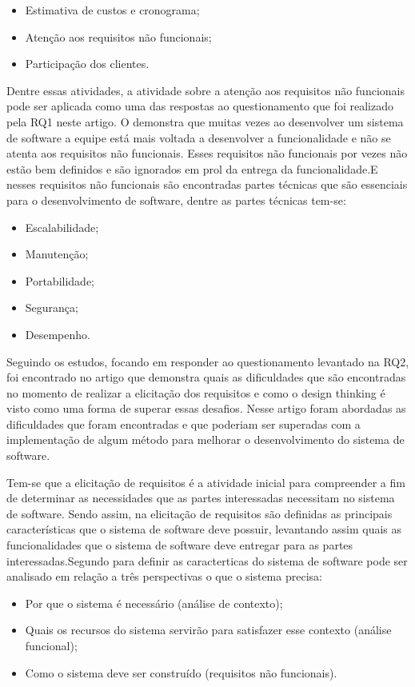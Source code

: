 \documentclass[a4paper,twoside]{article}
\begin{document}
\begin{itemize}
    \item Estimativa de custos e cronograma;
    \item Atenção aos requisitos não funcionais;
    \item Participação dos clientes.
\end{itemize}
Dentre essas atividades, a atividade sobre a atenção aos requisitos não funcionais pode ser aplicada como uma das respostas ao questionamento que foi realizado pela RQ1 neste artigo.
O \cite{DBLP:journals/information/MartinsJCKPO19} demonstra que muitas vezes ao desenvolver um sistema de software a equipe está mais voltada a desenvolver a funcionalidade e não se atenta aos requisitos não funcionais. Esses requisitos não funcionais por vezes não estão bem definidos e são ignorados em prol da entrega da funcionalidade.E nesses requisitos não funcionais são encontradas partes técnicas que são essenciais para o desenvolvimento de software, dentre as partes técnicas tem-se:

\begin{itemize}
    \item Escalabilidade;
    \item Manutenção;
    \item Portabilidade;
    \item Segurança;
    \item Desempenho.
\end{itemize}

Seguindo os estudos, focando em responder ao questionamento levantado na RQ2, foi encontrado no artigo \cite{DBLP:conf/sac/PereiraPPMC21} que demonstra quais as dificuldades que são encontradas no momento de realizar a elicitação dos requisitos e como o design thinking é visto como uma forma de superar essas desafios.
Nesse artigo foram abordadas as dificuldades que foram encontradas e que poderiam ser superadas com a implementação de algum método para melhorar o desenvolvimento do sistema de software.

Tem-se que a elicitação de requisitos é a atividade inicial para compreender a fim de determinar as necessidades que as partes interessadas necessitam no sistema de software. Sendo assim, na elicitação de requisitos são definidas as principais características que o sistema de software deve possuir, levantando assim quais as funcionalidades que o sistema de software deve entregar para as partes interessadas.Segundo \cite{DBLP:conf/sac/PereiraPPMC21} para definir as caracterticas do sistema de software pode ser analisado em relação a três perspectivas o que o sistema precisa:
\begin{itemize}
    \item Por que o sistema é necessário (análise de contexto);
    \item Quais os recursos do sistema servirão para satisfazer esse contexto (análise funcional);
    \item Como o sistema deve ser construído (requisitos não funcionais).
\end{itemize}
\end{document}
